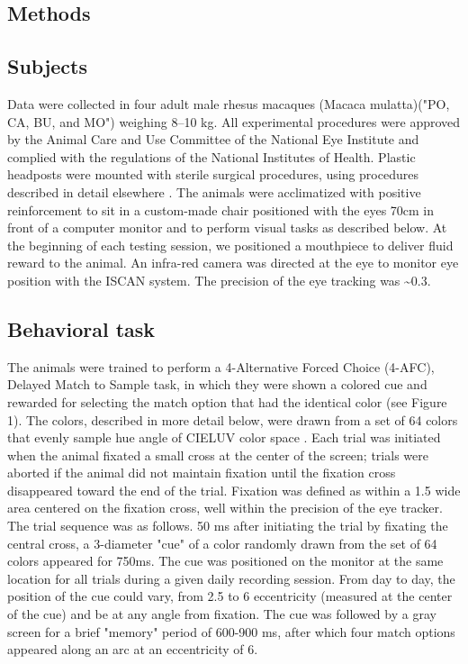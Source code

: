 \documentclass[9pt,biorxiv,lineno,onehalfspacing]{lapreprint}
\begin{document}
\begin{refsection}
\newpage

\section{Methods}

\subsection{Subjects}

Data were collected in four adult male rhesus macaques (Macaca mulatta)("PO, CA, BU, and MO") weighing 8–10 kg. 
All experimental procedures were approved by the Animal Care and Use Committee of the National Eye Institute and complied with the regulations of the National Institutes of Health. 
Plastic headposts were mounted with sterile surgical procedures, using procedures described in detail elsewhere \citep{lafer-sousa_parallel_2013}. 
The animals were acclimatized with positive reinforcement to sit in a custom-made chair positioned with the eyes 70cm in front of a computer monitor and to perform visual tasks as described below. 
At the beginning of each testing session, we positioned a mouthpiece to deliver fluid reward to the animal. 
An infra-red camera was directed at the eye to monitor eye position with the ISCAN system. 
The precision of the eye tracking was \textasciitilde0.3\degree{}. 

\subsection{Behavioral task}

The animals were trained to perform a 4-Alternative Forced Choice (4-AFC), Delayed Match to Sample task, in which they were shown a colored cue and rewarded for selecting the match option that had the identical color (see Figure 1). 
The colors, described in more detail below, were drawn from a set of 64 colors that evenly sample hue angle of CIELUV color space \citep{stockman_colorimetry_2010}. 
Each trial was initiated when the animal fixated a small cross at the center of the screen; trials were aborted if the animal did not maintain fixation until the fixation cross disappeared toward the end of the trial. 
Fixation was defined as within a 1.5\degree{} wide area centered on the fixation cross, well within the precision of the eye tracker.
The trial sequence was as follows. 
50 ms after initiating the trial by fixating the central cross, a 3\degree{}-diameter "cue"  of a color randomly drawn from the set of 64 colors appeared for 750ms. 
The cue was positioned on the monitor at the same location for all trials during a given daily recording session.
From day to day, the position of the cue could vary, from 2.5\degree{} to 6\degree{} eccentricity (measured at the center of the cue) and be at any angle from fixation.
The cue was followed by a gray screen for a brief "memory" period of 600-900 ms, after which four match options appeared along an arc at an eccentricity of 6\degree{}. 


\end{refsection}
\end{document}
